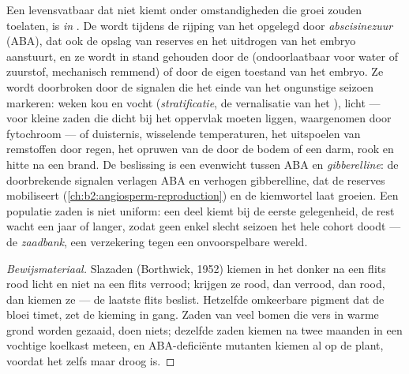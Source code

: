 \begin{definition}\label{def:b2:plant-flowering:dormancy}
Een levensvatbaar  dat niet kiemt onder omstandigheden die groei zouden
toelaten, is \emph{in }. De  wordt tijdens de rijping van
het  opgelegd door \emph{abscisinezuur} (ABA), dat ook de opslag van
reserves en het uitdrogen van het embryo aanstuurt, en ze wordt in stand
gehouden door de  (ondoorlaatbaar voor water of zuurstof, mechanisch
remmend) of door de eigen toestand van het embryo. Ze wordt doorbroken door
de signalen die het einde van het ongunstige seizoen markeren: weken kou en
vocht (\emph{stratificatie}, de vernalisatie van het ), licht --- voor
kleine zaden die dicht bij het oppervlak moeten liggen, waargenomen door
fytochroom --- of duisternis, wisselende temperaturen, het uitspoelen van
remstoffen door regen, het opruwen van de  door de bodem of een
darm, rook en hitte na een brand. De beslissing is een evenwicht tussen ABA
en \emph{gibberelline}: de doorbrekende signalen verlagen ABA en verhogen
gibberelline, dat de reserves mobiliseert
(\cref{ch:b2:angiosperm-reproduction}) en de kiemwortel laat groeien. Een
populatie zaden is niet uniform: een deel kiemt bij de eerste gelegenheid,
de rest wacht een jaar of langer, zodat geen enkel slecht seizoen het hele
cohort doodt --- de \emph{zaadbank}, een verzekering tegen een
onvoorspelbare wereld.
\end{definition}
\begin{proof}[Bewijsmateriaal]
Slazaden (Borthwick, 1952) kiemen in het donker na een flits rood licht en
niet na een flits verrood; krijgen ze rood, dan verrood, dan rood, dan
kiemen ze --- de laatste flits beslist. Hetzelfde omkeerbare pigment dat de
bloei timet, zet de kieming in gang. Zaden van veel bomen die vers in warme
grond worden gezaaid, doen niets; dezelfde zaden kiemen na twee maanden in
een vochtige koelkast meteen, en ABA-deficiënte mutanten kiemen al op de
plant, voordat het  zelfs maar droog is.
\end{proof}

